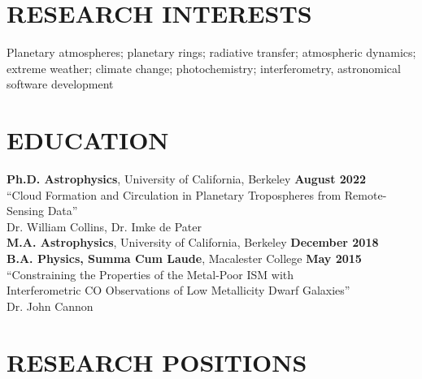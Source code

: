 \documentclass[margin, 10pt]{res} %
\newcommand\tab[1][1cm]{\hspace*{#1}}
\begin{document}
\begin{resume}
	

\section{RESEARCH INTERESTS}
Planetary atmospheres; planetary rings; radiative transfer; atmospheric dynamics; extreme weather; climate change; photochemistry; interferometry, astronomical software development
 

\section{EDUCATION}

{\bf Ph.D. Astrophysics}, University of California, Berkeley \hfill
{\bf August 2022} \\
\tab {\it Thesis:} ``Cloud Formation and Circulation in Planetary Tropospheres %
from Remote-Sensing Data'' \\
\tab {\it Advisers:} Dr. William Collins, Dr. Imke de Pater \\
{\bf M.A. Astrophysics}, University of California, Berkeley \hfill
{\bf December 2018} \\
{\bf B.A. Physics, Summa Cum Laude}, Macalester College \hfill {\bf
  May 2015} \\
\tab {\it Thesis:}  ``Constraining the Properties of the Metal-Poor
ISM with \\ \tab \tab \tab Interferometric CO Observations of Low Metallicity Dwarf
Galaxies'' \\
\tab {\it Adviser:} Dr. John Cannon


\section{RESEARCH POSITIONS}


\end{resume}
\end{document}
